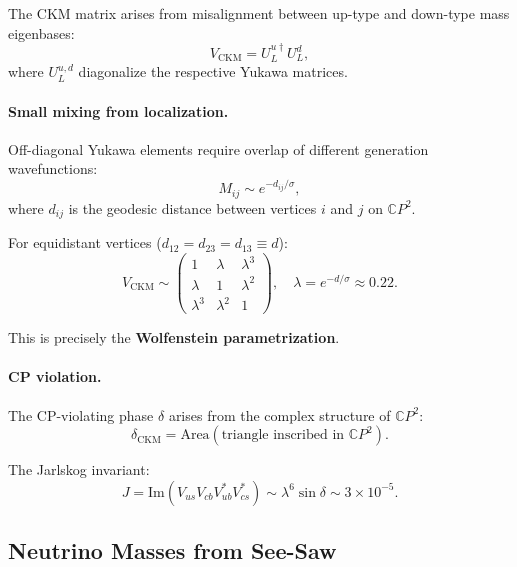 \begin{theorem}\label{thm:ckm}
The CKM matrix arises from misalignment between up-type and down-type mass eigenbases:
\begin{equation}
V_{\text{CKM}} = U_L^{u\dagger} U_L^d,
\end{equation}
where $U_L^{u,d}$ diagonalize the respective Yukawa matrices.
\end{theorem}

\paragraph{Small mixing from localization.}
Off-diagonal Yukawa elements require overlap of different generation wavefunctions:
\begin{equation}
M_{ij} \sim e^{-d_{ij}/\sigma},
\end{equation}
where $d_{ij}$ is the geodesic distance between vertices $i$ and $j$ on $\mathbb{C}P^2$.

For equidistant vertices ($d_{12} = d_{23} = d_{13} \equiv d$):
\begin{equation}
V_{\text{CKM}} \sim \begin{pmatrix} 
1 & \lambda & \lambda^3 \\ 
\lambda & 1 & \lambda^2 \\ 
\lambda^3 & \lambda^2 & 1 
\end{pmatrix}, \quad \lambda = e^{-d/\sigma} \approx 0.22.
\end{equation}

This is precisely the \textbf{Wolfenstein parametrization}.

\paragraph{CP violation.}
The CP-violating phase $\delta$ arises from the complex structure of $\mathbb{C}P^2$:
\begin{equation}
\delta_{\text{CKM}} = \text{Area}(\text{triangle inscribed in } \mathbb{C}P^2).
\end{equation}

The Jarlskog invariant:
\begin{equation}
J = \text{Im}(V_{us}V_{cb}V_{ub}^*V_{cs}^*) \sim \lambda^6 \sin\delta \sim 3 \times 10^{-5}.
\end{equation}

\subsection{Neutrino Masses from See-Saw}\label{app:neutrino-H}

